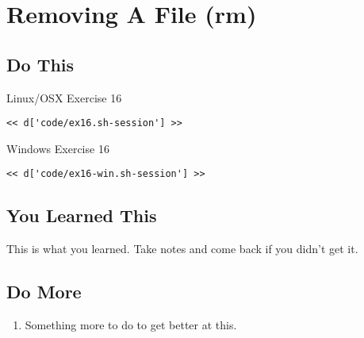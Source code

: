 \chapter{Removing A File (rm)}

\section{Do This}

\begin{code}{Linux/OSX Exercise 16}
\begin{Verbatim}
<< d['code/ex16.sh-session'] >>
\end{Verbatim}
\end{code}

\begin{code}{Windows Exercise 16}
\begin{Verbatim}
<< d['code/ex16-win.sh-session'] >>
\end{Verbatim}
\end{code}

\section{You Learned This}

This is what you learned.  Take notes and come back if you didn't get it.

\section{Do More}

\begin{enumerate}
\item Something more to do to get better at this.
\end{enumerate}

